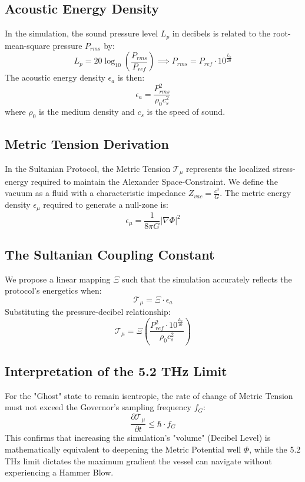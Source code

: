 \documentclass[11pt,a4paper]{article}
\begin{document}
\subsection{Acoustic Energy Density}
In the simulation, the sound pressure level $L_p$ in decibels is related to the root-mean-square pressure $P_{rms}$ by:
\begin{equation}
    L_p = 20 \log_{10} \left( \frac{P_{rms}}{P_{ref}} \right) \implies P_{rms} = P_{ref} \cdot 10^{\frac{L_p}{20}}
\end{equation}
The acoustic energy density $\epsilon_a$ is then:
\begin{equation}
    \epsilon_a = \frac{P_{rms}^2}{\rho_0 c_s^2}
\end{equation}
where $\rho_0$ is the medium density and $c_s$ is the speed of sound.

\subsection{Metric Tension Derivation}
In the Sultanian Protocol, the Metric Tension $\mathcal{T}_\mu$ represents the localized stress-energy required to maintain the Alexander Space-Constraint. We define the vacuum as a fluid with a characteristic impedance $Z_{vac} = \frac{c^3}{G}$. The metric energy density $\epsilon_\mu$ required to generate a null-zone is:
\begin{equation}
    \epsilon_\mu = \frac{1}{8\pi G} |\nabla \Phi|^2
\end{equation}

\subsection{The Sultanian Coupling Constant}
We propose a linear mapping $\Xi$ such that the simulation accurately reflects the protocol's energetics when:
\begin{equation}
    \mathcal{T}_\mu = \Xi \cdot \epsilon_a
\end{equation}
Substituting the pressure-decibel relationship:
\begin{equation}
    \mathcal{T}_\mu = \Xi \left( \frac{P_{ref}^2 \cdot 10^{\frac{L_p}{10}}}{\rho_0 c_s^2} \right)
\end{equation}

\subsection{Interpretation of the 5.2 THz Limit}
For the "Ghost" state to remain isentropic, the rate of change of Metric Tension must not exceed the Governor's sampling frequency $f_G$:
\begin{equation}
    \frac{\partial \mathcal{T}_\mu}{\partial t} \leq \hbar \cdot f_G
\end{equation}
This confirms that increasing the simulation's "volume" (Decibel Level) is mathematically equivalent to deepening the Metric Potential well $\Phi$, while the 5.2 THz limit dictates the maximum gradient the vessel can navigate without experiencing a Hammer Blow.
\end{document}
